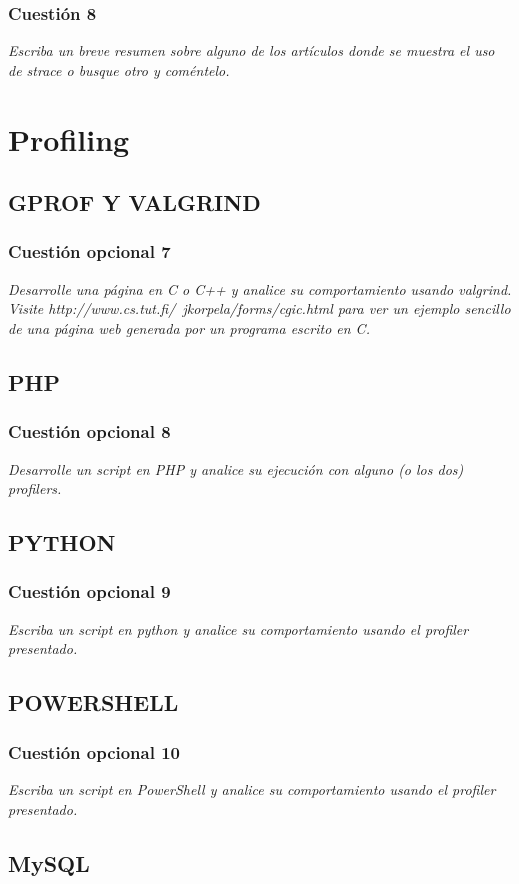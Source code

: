 \subsubsection{Cuestión 8}
\textit{Escriba un breve resumen sobre alguno de los artículos donde se muestra el uso de strace o busque otro y coméntelo.}
\section{Profiling}
\subsection{GPROF Y VALGRIND}
\subsubsection{Cuestión opcional 7}
\textit{Desarrolle una página en C o C++ y analice su comportamiento usando valgrind. Visite http://www.cs.tut.fi/~jkorpela/forms/cgic.html para ver un ejemplo sencillo de una página web generada por un programa escrito en C.}
\subsection{PHP}
\subsubsection{Cuestión opcional 8}
\textit{Desarrolle un script en PHP y analice su ejecución con alguno (o los dos) profilers.}
\subsection{PYTHON}
\subsubsection{Cuestión opcional 9}
\textit{Escriba un script en python y analice su comportamiento usando el profiler presentado.}

\subsection{POWERSHELL}
\subsubsection{Cuestión opcional 10}
\textit{Escriba un script en PowerShell y analice su comportamiento usando el profiler presentado.}
\subsection{MySQL}
